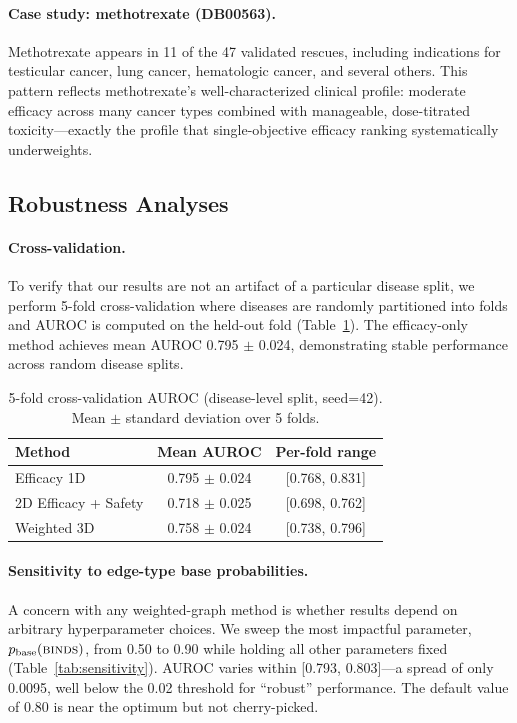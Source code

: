 \documentclass[11pt,a4paper]{article}
\begin{document}
\paragraph{Case study: methotrexate (DB00563).}
Methotrexate appears in 11 of the 47 validated rescues, including
indications for testicular cancer, lung cancer, hematologic cancer, and
several others. This pattern reflects methotrexate's well-characterized
clinical profile: moderate efficacy across many cancer types combined
with manageable, dose-titrated toxicity---exactly the profile that
single-objective efficacy ranking systematically underweights.

\subsection{Robustness Analyses}
\label{sec:results:robustness}

\paragraph{Cross-validation.}
To verify that our results are not an artifact of a particular
disease split, we perform 5-fold cross-validation where diseases are
randomly partitioned into folds and AUROC is computed on the held-out
fold (Table~\ref{tab:cv}). The efficacy-only method achieves mean
AUROC 0.795 $\pm$ 0.024, demonstrating stable performance across
random disease splits.

\begin{table}[t]
\centering
\caption{5-fold cross-validation AUROC (disease-level split, seed=42).
Mean $\pm$ standard deviation over 5 folds.}
\label{tab:cv}
\begin{tabular}{lcc}
\toprule
\textbf{Method} & \textbf{Mean AUROC} & \textbf{Per-fold range} \\
\midrule
Efficacy 1D           & 0.795 $\pm$ 0.024 & [0.768, 0.831] \\
2D Efficacy + Safety  & 0.718 $\pm$ 0.025 & [0.698, 0.762] \\
Weighted 3D           & 0.758 $\pm$ 0.024 & [0.738, 0.796] \\
\bottomrule
\end{tabular}
\end{table}

\paragraph{Sensitivity to edge-type base probabilities.}
A concern with any weighted-graph method is whether results depend on
arbitrary hyperparameter choices. We sweep the most impactful parameter,
$p_\text{base}(\textsc{binds})$, from 0.50 to 0.90 while holding all
other parameters fixed (Table~\ref{tab:sensitivity}). AUROC varies
within [0.793, 0.803]---a spread of only 0.0095, well below the
0.02 threshold for ``robust'' performance. The default value of 0.80
is near the optimum but not cherry-picked.
\end{document}
